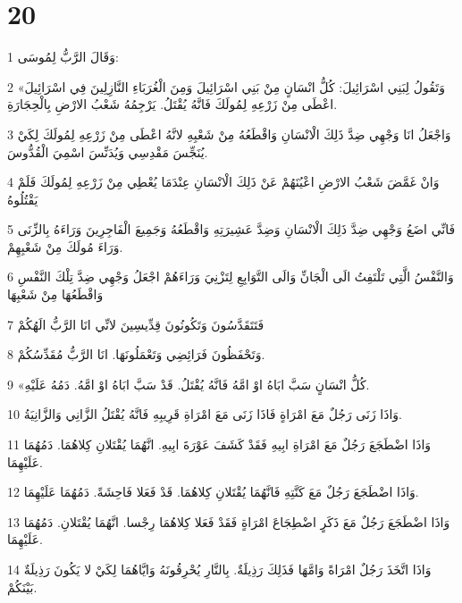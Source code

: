 \chapter{20}

\par 1 وَقَالَ الرَّبُّ لِمُوسَى:
\par 2 «وَتَقُولُ لِبَنِي اسْرَائِيلَ: كُلُّ انْسَانٍ مِنْ بَنِي اسْرَائِيلَ وَمِنَ الْغُرَبَاءِ النَّازِلِينَ فِي اسْرَائِيلَ اعْطَى مِنْ زَرْعِهِ لِمُولَكَ فَانَّهُ يُقْتَلُ. يَرْجِمُهُ شَعْبُ الارْضِ بِالْحِجَارَةِ.
\par 3 وَاجْعَلُ انَا وَجْهِي ضِدَّ ذَلِكَ الْانْسَانِ وَاقْطَعُهُ مِنْ شَعْبِهِ لانَّهُ اعْطَى مِنْ زَرْعِهِ لِمُولَكَ لِكَيْ يُنَجِّسَ مَقْدِسِي وَيُدَنِّسَ اسْمِيَ الْقُدُّوسَ.
\par 4 وَانْ غَمَّضَ شَعْبُ الارْضِ اعْيُنَهُمْ عَنْ ذَلِكَ الْانْسَانِ عِنْدَمَا يُعْطِي مِنْ زَرْعِهِ لِمُولَكَ فَلَمْ يَقْتُلُوهُ
\par 5 فَانِّي اضَعُ وَجْهِي ضِدَّ ذَلِكَ الْانْسَانِ وَضِدَّ عَشِيرَتِهِ وَاقْطَعُهُ وَجَمِيعَ الْفَاجِرِينَ وَرَاءَهُ بِالزِّنَى وَرَاءَ مُولَكَ مِنْ شَعْبِهِمْ.
\par 6 وَالنَّفْسُ الَّتِي تَلْتَفِتُ الَى الْجَانِّ وَالَى التَّوَابِعِ لِتَزْنِيَ وَرَاءَهُمْ اجْعَلُ وَجْهِي ضِدَّ تِلْكَ النَّفْسِ وَاقْطَعُهَا مِنْ شَعْبِهَا
\par 7 فَتَتَقَدَّسُونَ وَتَكُونُونَ قِدِّيسِينَ لانِّي انَا الرَّبُّ الَهُكُمْ
\par 8 وَتَحْفَظُونَ فَرَائِضِي وَتَعْمَلُونَهَا. انَا الرَّبُّ مُقَدِّسُكُمْ.
\par 9 «كُلُّ انْسَانٍ سَبَّ ابَاهُ اوْ امَّهُ فَانَّهُ يُقْتَلُ. قَدْ سَبَّ ابَاهُ اوْ امَّهُ. دَمُهُ عَلَيْهِ.
\par 10 وَاذَا زَنَى رَجُلٌ مَعَ امْرَاةٍ فَاذَا زَنَى مَعَ امْرَاةِ قَرِيبِهِ فَانَّهُ يُقْتَلُ الزَّانِي وَالزَّانِيَةُ.
\par 11 وَاذَا اضْطَجَعَ رَجُلٌ مَعَ امْرَاةِ ابِيهِ فَقَدْ كَشَفَ عَوْرَةَ ابِيهِ. انَّهُمَا يُقْتَلانِ كِلاهُمَا. دَمُهُمَا عَلَيْهِمَا.
\par 12 وَاذَا اضْطَجَعَ رَجُلٌ مَعَ كَنَّتِهِ فَانَّهُمَا يُقْتَلانِ كِلاهُمَا. قَدْ فَعَلا فَاحِشَةً. دَمُهُمَا عَلَيْهِمَا.
\par 13 وَاذَا اضْطَجَعَ رَجُلٌ مَعَ ذَكَرٍ اضْطِجَاعَ امْرَاةٍ فَقَدْ فَعَلا كِلاهُمَا رِجْسا. انَّهُمَا يُقْتَلانِ. دَمُهُمَا عَلَيْهِمَا.
\par 14 وَاذَا اتَّخَذَ رَجُلٌ امْرَاةً وَامَّهَا فَذَلِكَ رَذِيلَةٌ. بِالنَّارِ يُحْرِقُونَهُ وَايَّاهُمَا لِكَيْ لا يَكُونَ رَذِيلَةٌ بَيْنَكُمْ.
